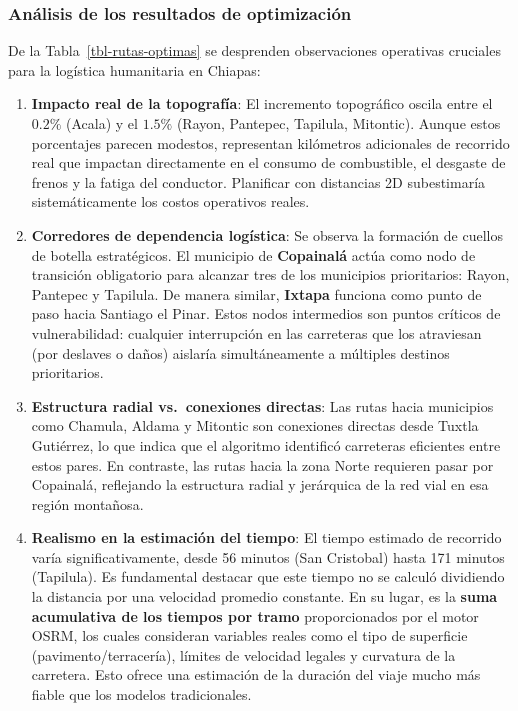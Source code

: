 \documentclass[
  spanish,
  us-letterpaper,
]{scrreprt}
\numberwithin{equation}{section}
\begin{document}
\subsubsection{Análisis de los resultados de
optimización}\label{anuxe1lisis-de-los-resultados-de-optimizaciuxf3n}

De la Tabla~\ref{tbl-rutas-optimas} se desprenden observaciones
operativas cruciales para la logística humanitaria en Chiapas:

\begin{enumerate}
\def\labelenumi{\arabic{enumi}.}
\item
  \textbf{Impacto real de la topografía}: El incremento topográfico
  oscila entre el \(0.2\%\) (Acala) y el \(1.5\%\) (Rayon, Pantepec,
  Tapilula, Mitontic). Aunque estos porcentajes parecen modestos,
  representan kilómetros adicionales de recorrido real que impactan
  directamente en el consumo de combustible, el desgaste de frenos y la
  fatiga del conductor. Planificar con distancias 2D subestimaría
  sistemáticamente los costos operativos reales.
\item
  \textbf{Corredores de dependencia logística}: Se observa la formación
  de cuellos de botella estratégicos. El municipio de \textbf{Copainalá}
  actúa como nodo de transición obligatorio para alcanzar tres de los
  municipios prioritarios: Rayon, Pantepec y Tapilula. De manera
  similar, \textbf{Ixtapa} funciona como punto de paso hacia Santiago el
  Pinar. Estos nodos intermedios son puntos críticos de vulnerabilidad:
  cualquier interrupción en las carreteras que los atraviesan (por
  deslaves o daños) aislaría simultáneamente a múltiples destinos
  prioritarios.
\item
  \textbf{Estructura radial vs.~conexiones directas}: Las rutas hacia
  municipios como Chamula, Aldama y Mitontic son conexiones directas
  desde Tuxtla Gutiérrez, lo que indica que el algoritmo identificó
  carreteras eficientes entre estos pares. En contraste, las rutas hacia
  la zona Norte requieren pasar por Copainalá, reflejando la estructura
  radial y jerárquica de la red vial en esa región montañosa.
\item
  \textbf{Realismo en la estimación del tiempo}: El tiempo estimado de
  recorrido varía significativamente, desde 56 minutos (San Cristobal)
  hasta 171 minutos (Tapilula). Es fundamental destacar que este tiempo
  no se calculó dividiendo la distancia por una velocidad promedio
  constante. En su lugar, es la \textbf{suma acumulativa de los tiempos
  por tramo} proporcionados por el motor OSRM, los cuales consideran
  variables reales como el tipo de superficie (pavimento/terracería),
  límites de velocidad legales y curvatura de la carretera. Esto ofrece
  una estimación de la duración del viaje mucho más fiable que los
  modelos tradicionales.
\end{enumerate}
\end{document}
